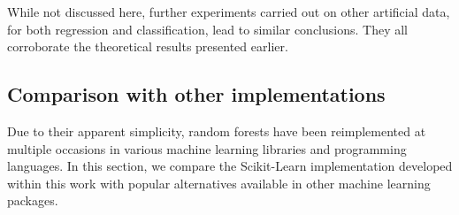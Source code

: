 While not discussed here, further experiments carried out on other artificial
data, for both regression and classification, lead to similar conclusions. They
all corroborate the theoretical results presented earlier.

\subsection{Comparison with other implementations}

Due to their apparent simplicity, random forests have been reimplemented at
multiple occasions in various machine learning libraries and programming
languages. In this section, we compare the Scikit-Learn implementation
developed within this work with popular alternatives available in other machine
learning packages.

